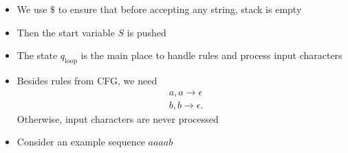 \begin{frame}[allowframebreaks]
\begin{itemize}



\item We use $\$$ to ensure that before accepting
  any string, stack is empty
\item Then the start variable $S$ is pushed
\item The state $q_{\text{loop}}$ is the main place to handle rules and process input characters
\item Besides rules from CFG, we need
  \begin{equation*}
    \begin{split}
      & a, a \rightarrow \epsilon\\
      & b, b \rightarrow \epsilon.
    \end{split}
  \end{equation*}
Otherwise, input characters are never processed
\item Consider an example sequence $aaaab$
\end{itemize}


\end{frame}
